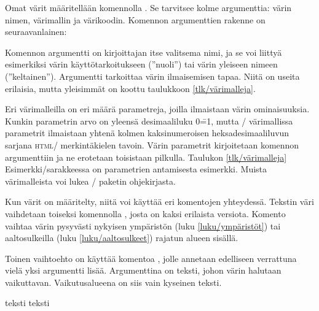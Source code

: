 Omat värit määritellään komennolla . Se tarvitsee
kolme argumenttia: värin nimen, värimallin ja värikoodin. Komennon
argumenttien rakenne on seuraavanlainen:

\begin{koodilohkosis}
\end{koodilohkosis}

\noindent
Komennon argumentti  on kirjoittajan itse valitsema nimi,
ja se voi liittyä esimerkiksi värin käyttötarkoitukseen (''nuoli'') tai
värin yleiseen nimeen (''keltainen''). Argumentti 
tarkoittaa värin ilmaisemisen tapaa. Niitä on useita erilaisia, mutta
yleisimmät on koottu taulukkoon \ref{tlk/värimalleja}.

Eri värimalleilla on eri määrä parametreja, joilla ilmaistaan värin
ominaisuuksia. Kunkin parametrin arvo on yleensä desimaaliluku 0\==1,
mutta \-/ värimallissa parametrit ilmaistaan yhtenä kolmen
kaksinumeroisen heksadesimaaliluvun sarjana \textsc{html}\-/
merkintäkielen tavoin. Värin parametrit kirjoitetaan komennon
argumenttiin  ja ne erotetaan toisistaan pilkulla.
Taulukon \ref{tlk/värimalleja} Esimerkki\-/sarakkeessa on parametrien
antamisesta esimerkki. Muista värimalleista voi lukea
\-/ paketin ohjekirjasta.

Kun värit on määritelty, niitä voi käyttää eri komentojen yhteydessä.
Tekstin väri vaihdetaan toiseksi komennolla , josta on
kaksi erilaista versiota. Komento vaihtaa värin pysyvästi nykyisen
ympäristön (luku \ref{luku/ympäristöt}) tai aaltosulkeilla (luku
\ref{luku/aaltosulkeet}) rajatun alueen sisällä.

\begin{koodilohkosis}
\color{nimi}                  %
\color[värimalli]{parametrit} %
\end{koodilohkosis}

\noindent
Toinen vaihtoehto on käyttää komentoa , jolle
annetaan edelliseen verrattuna vielä yksi argumentti lisää. Argumenttina
on teksti, johon värin halutaan vaikuttavan. Vaikutusalueena on siis
vain kyseinen teksti.

\begin{koodilohkosis}
\textcolor{nimi}{teksti}
\textcolor[värimalli]{parametrit}{teksti}
\end{koodilohkosis}

